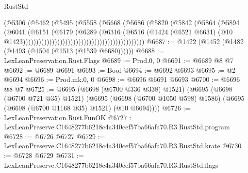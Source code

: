\begin{lexlean}{RustStd}
\begin{coremodule}
                                                            (@5306
                                                              (@5462
                                                                (@5495
                                                                  (@5558
                                                                    (@5668
                                                                      (@5686
                                                                        (@5820
                                                                          (@5842
                                                                            (@5864
                                                                              (@5894
                                                                                (@6041
                                                                                  (@6151
                                                                                    (@6179
                                                                                      (@6289
                                                                                        (@6316
                                                                                          (@6516
                                                                                            (@1424
                                                                                              (@6521
                                                                                                @6631)
                                                                                              (@10
                                                                                                @1423))))))))))))))))))))))))))))))))))))))))))))))
@6687 := @1422 (@1452 (@1482 (@1493 (@1504 (@1513 (@1539 @6680))))))
@6688 := LexLeanPreservation.Rust.Flags
@6689 := Prod.{0, 0}
@6691 := @6689 @8 @7
@6692 := @6689 @6691
@6693 := Bool
@6694 := @6692 @6693
@6695 := @2 @6694
@6696 := Prod.mk.{0, 0}
@6698 := @6696 @6691 @6693
@6700 := @6696 @8 @7
@6725 := @6695
    (@6698 (@6700 @336 @338) @1521)
    (@6695
      (@6698 (@6700 @721 @35) @1521)
      (@6695 (@6698 (@6700 @1050 @598) @1586) (@6695 (@6698 (@6700 @1168 @35) @1521) (@10 @6694))))
@6726 := LexLeanPreservation.Rust.FunOK
@6727 := LexLeanPreserve.C1648277b6218c4a340cef57ba66afa70.R3.RustStd.program
@6728 := @6726 @6727
@6729 := LexLeanPreserve.C1648277b6218c4a340cef57ba66afa70.R3.RustStd.krate
@6730 := @6728 @6729
@6731 := LexLeanPreserve.C1648277b6218c4a340cef57ba66afa70.R3.RustStd.flags

\end{coremodule}
\end{lexlean}
